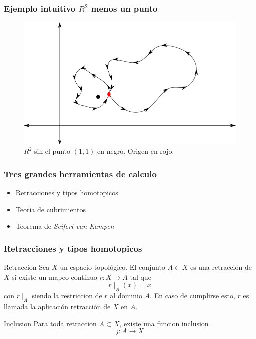 \documentclass[xetex,mathserif,serif]{beamer}
\newcommand{\vank}{\emph{Seifert-van Kampen} }
\begin{document}
  \begin{frame}
    \frametitle{Ejemplo intuitivo \(R^2\) menos un punto}
    \begin{figure}[h]
      \centering
      \includegraphics[scale=0.5]{../tesis/imagenes/R2-punto.png}
      \caption{\(R^2\) sin el punto \((1,1)\) en negro. Origen en rojo. }
    \end{figure}

  \end{frame}

  \begin{frame}
    \frametitle{Tres grandes herramientas de calculo}
    \begin{itemize}
    \item Retracciones y tipos homotopicos
    \item Teoria de cubrimientos
    \item Teorema de \vank
    \end{itemize}
  \end{frame}

  \begin{frame}
    \frametitle{Retracciones y tipos homotopicos}
    \begin{block}{Retraccion}
      Sea \(X\) un espacio topológico. El conjunto \(A \subset X\) es una
      retracción de \(X\) si existe un mapeo continuo \(r : X \to A\) tal que
      \[ r \mid_{A} (x) = x \]
      con \(r \mid_{A}\) siendo la restriccion de \(r\) al dominio \(A\). En
      caso de cumplirse esto, \(r\) es llamada la aplicación retracción de
      \(X\) en \(A\).
    \end{block}

    \begin{block}{Inclusion}
      Para toda retraccion \(A \subset X\), existe una funcion inclusion
      \[ j : A \to X \]
    \end{block}
  \end{frame}
\end{document}
